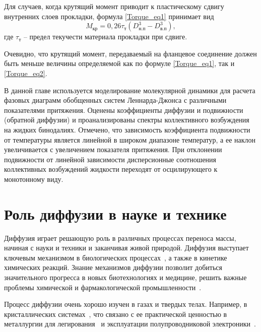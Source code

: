 Для случаев, когда крутящий момент приводит к пластическому сдвигу внутренних слоев прокладки, формула \eqref{Torque_eq1} принимает вид
\begin{equation}
  \label{Torque_eq2}
  M_{\text{кр}}=0,26\tau_{\text{т}}\left(D_{\text{н.п}}^3-D_{\text{в.п}}^3\right),
\end{equation} 
где $\tau_{\text{т}}$ -- предел текучести материала прокладки при сдвиге.

Очевидно, что крутящий момент, передаваемый на фланцевое соединение должен быть меньше величины определяемой как по формуле \eqref{Torque_eq1}, так и \eqref{Torque_eq2}.





В данной главе используется моделирование молекулярной динамики для расчета фазовых диаграмм обобщенных систем Леннарда-Джонса с различными показателями притяжения.
Оценены коэффициенты диффузии и подвижности (обратной диффузии) и проанализированы спектры коллективного возбуждения на жидких бинодалиях. 
Отмечено, что зависимость коэффициента подвижности от температуры является линейной в широком диапазоне температур, а ее наклон увеличивается с увеличением показателя притяжения.
При отклонении подвижности от линейной зависимости дисперсионные соотношения коллективных возбуждений жидкости переходят от осцилирующего к монотонному виду.

\section{Роль диффузии в науке и технике}
\label{MACR-SecIntroduction}

Диффузия играет решающую роль в различных процессах переноса массы, начиная с науки и техники и заканчивая живой природой.
Диффузия выступает ключевым механизмом в биологических процессах~\cite{10.1016/j.bbagen.2013.09.037, 10.1038/s41598-018-22643-9}, а также в кинетике химических реакций.
Знание механизмов диффузии позволит добиться значительного прогресса в новых биотехнологиях и медицине, решить важные проблемы химической и фармакологической промышленности~\cite{10.1002/3527602836}.

Процесс диффузии очень хорошо изучен в газах и твердых телах.
Например, в кристаллических системах~\cite{10.1016/0079-6816(95)00039-2}, что связано с ее практической ценностью в металлургии для легирования~\cite{10.1016/s0924-0136(96)02826-9, 10.1016/j.actamat.2015.10.010, 10.1134/s1063783411110308} и эксплуатации полупроводниковой электроники~\cite{10.1103/physrevlett.84.4220, 10.1016/j.physrep.2009.10.003}.

